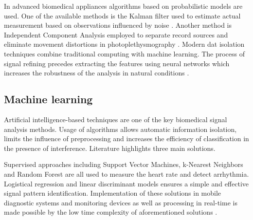 \documentclass[journal]{IEEEtran}
\begin{document}
In advanced biomedical appliances algorithms based on probabilistic models are used. One of the available methods is the Kalman filter used to estimate actual measurement based on observations influenced by noise \cite{8}. Another method is Independent Component Analysis employed to separate record sources and eliminate movement distortions in photoplethysmography  \cite{9}. Modern dat isolation techniques combine traditional computing with machine learning. The process of signal refining precedes extracting the features using neural networks which increases the robustness of the analysis in natural conditions \cite{10}.

\subsection{Machine learning}
Artificial intelligence-based techniques are one of the key biomedical signal analysis methods. Usage of algorithms allows automatic information isolation, limits the influence of preprocessing and increases the efficiency of classification in the presence of interference. Literature highlights three main solutions.

Supervised approaches including Support Vector Machines, k-Nearest Neighbors and Random Forest are all used to measure the heart rate and detect arrhythmia. Logistical regression and linear discriminant models ensures a simple and effective signal pattern identification.
Implementation of these solutions in mobile diagnostic systems and monitoring devices as well as processing in real-time is made possible by the low time complexity of aforementioned solutions \cite{11}.
\end{document}
